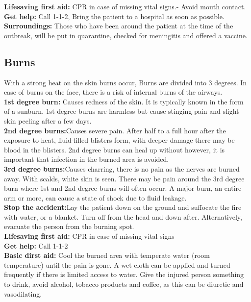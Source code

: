 \documentclass[../../../main.tex]{subfiles}
\begin{document}
\begin{multicols}{2}
\textbf{Lifesaving first aid:} CPR in case of missing vital signs.- Avoid mouth contact.
\\

\textbf{Get help:} Call 1-1-2, Bring the patient to a hospital as soon as possible.
\\

\textbf{Surroundings:} Those who have been around the patient at the time of the outbreak, will be put in quarantine, checked for meningitis and offered a vaccine.
\\
\subsection*{Burns}With a strong heat on the skin burns occur, Burns are divided into 3 degrees. In case of burns on the face, there is a risk of internal burns of the airways.
\\

\textbf{1st degree burn:} Causes redness of the skin. It is typically known in the form of a sunburn. 1st degree burns are harmless but cause stinging pain and slight skin peeling after a few days.
\\

\textbf{2nd degree burns:}Causes severe pain. After half to a full hour after the exposure to heat, fluid-filled blisters form, with deeper damage there may be blood in the blisters. 2nd degree burns can heal up without however, it is important that infection in the burned area is avoided.
\\

\textbf{3rd degree burns:}Causes charring, there is no pain as the nerves are burned away. With scalds, white skin is seen. There may be pain around the 3rd degree burn where 1st and 2nd degree burns will often occur. A major burn, an entire arm or more, can cause a state of shock due to fluid leakage. 
\\

\textbf{Stop the accident:}Lay the patient down on the ground and suffocate the fire with water, or a blanket. Turn off from the head and down after. Alternatively, evacuate the person from the burning spot.
\\

\textbf{Lifesaving first aid:} CPR in case of missing vital signs
\\

\textbf{Get help:} Call 1-1-2
\\

\textbf{Basic dirst aid:} Cool the burned area with temperate water (room temperature) until the pain is gone. A wet cloth can be applied and turned frequently if there is limited access to water. Give the injured person something to drink, avoid alcohol, tobacco products and coffee, as this can be diuretic and vasodilating.
\\


\end{multicols}
\end{document}

